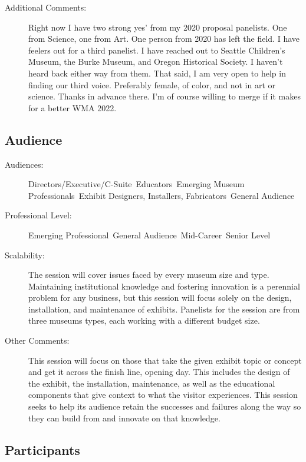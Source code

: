 \documentclass{report}
\begin{document}
\begin{description}
                    \item [Additional Comments: ]Right now I have two strong yes' from my 2020 proposal panelists. One from Science, one from Art. One person from 2020 has left the field. I have feelers out for a third panelist. I have reached out to Seattle Children's Museum, the Burke Museum, and Oregon Historical Society. I haven't heard back either way from them. 
That said, I am very open to help in finding our third voice. Preferably female, of color, and not in art or science. Thanks in advance there.
I'm of course willing to merge if it makes for a better WMA 2022.

                \end{description}
              \subsection*{Audience}
                \begin{description}
                  \item [Audiences:]Directors/Executive/C-Suite~Educators~Emerging Museum Professionals~Exhibit Designers, Installers, Fabricators~General Audience~
                  \item[Professional Level:]Emerging Professional~General Audience~Mid-Career~Senior Level~
                \item[Scalability:] The session will cover issues faced by every museum size and type. Maintaining institutional knowledge and fostering innovation is a perennial problem for any business, but this session will focus solely on the design, installation, and maintenance of exhibits. Panelists for the session are from three museums types, each working with a different budget size.

							
              \item[Other Comments:] This session will focus on those that take the given exhibit topic or concept and get it across the finish line, opening day. This includes the design of the exhibit, the installation, maintenance, as well as the educational components that give context to what the visitor experiences.
This session seeks to help its audience retain the successes and failures along the way so they can build from and innovate on that knowledge.
              \end{description}
            \subsection*{Participants}
\end{document}
